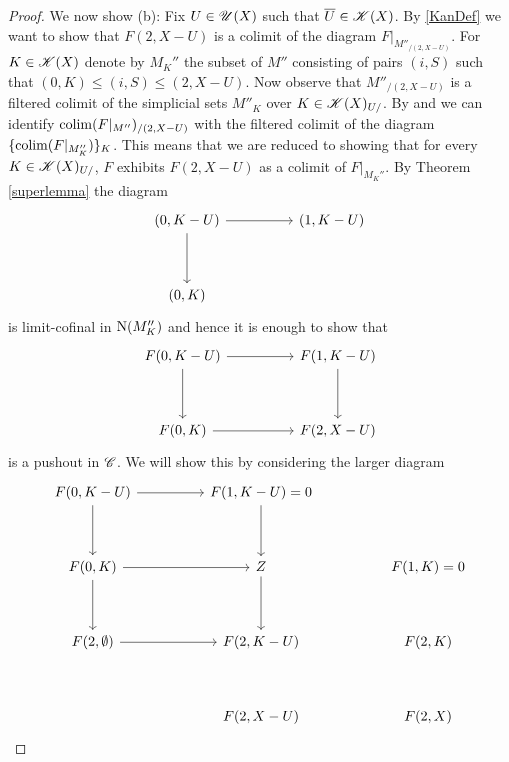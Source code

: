 \documentclass[../../thesis.tex]{subfiles}
\begin{document}
\begin{proof}
    We now show (b):
    Fix $U \in \mathscr{U}(X)$ such that $\overline{U} \in \mathscr{K}(X)$. By \ref{KanDef} we want to show that $F(2, X-U)$ is a colimit of the diagram $F|_{M''_{/(2,X-U)}}$.
    For $K \in \mathscr{K}(X)$ denote by $M_K''$ the subset of $M''$ consisting of pairs $(i,S)$ such that $(0,K)\leq (i,S) \leq (2,X-U)$.
    Now observe that $M''_{/(2,X-U)}$ is a filtered colimit of the simplicial sets $M''_K$ over ${K\in \mathscr{K}(X)_{U/}}$.
    By \cite[Remark 4.2.3.9.]{HTT} and \cite[Corollary 4.2.3.10.]{HTT} we can identify $\operatorname*{colim}(F|_{M''})_{/(2,X-U)}$ with the filtered colimit of the diagram $\{\operatorname*{colim}(F|_{M_K''})\}_K$.
    This means that we are reduced to showing that for every $K \in \mathscr{K}(X)_{U/}$, $F$ exhibits $F(2,X-U)$ as a colimit of $F|_{M_K''}$.
    By Theorem \ref{superlemma} the diagram
    \[\begin{tikzcd}
            {(0,K-U)} && {(1,K-U)} \\
            \\
            {(0,K)}
            \arrow[from=1-1, to=1-3]
            \arrow[from=1-1, to=3-1]
        \end{tikzcd}\]
    is limit-cofinal in $\mathrm{N}(M_K'')$ and hence it is enough to show that
    \[\begin{tikzcd}
            {F(0,K-U)} && {F(1,K-U)} \\
            \\
            {F(0,K)} && {F(2,X-U)}
            \arrow[from=1-1, to=1-3]
            \arrow[from=1-1, to=3-1]
            \arrow[from=1-3, to=3-3]
            \arrow[from=3-1, to=3-3]
        \end{tikzcd}\]
    is a pushout in $\mathscr{C}$.
    We will show this by considering the larger diagram
    \[\begin{tikzcd}
            {F(0,K-U)} && {F(1,K-U) = 0} \\
            \\
            {F(0,K)} && Z && {F(1,K) = 0} \\
            \\
            {F(2,\emptyset)} && {F(2,K-U)} && {F(2,K)} \\
            \\
            && {F(2,X-U)} && {F(2,X)}
            \arrow[from=1-1, to=1-3]
            \arrow[from=1-1, to=3-1]
            \arrow[from=1-3, to=3-3]
            \arrow[from=3-1, to=3-3]
            \arrow[from=3-1, to=5-1]
            \arrow[from=5-1, to=5-3]
            \arrow[from=3-3, to=5-3]

\end{tikzcd}\]
\end{proof}
\end{document}
